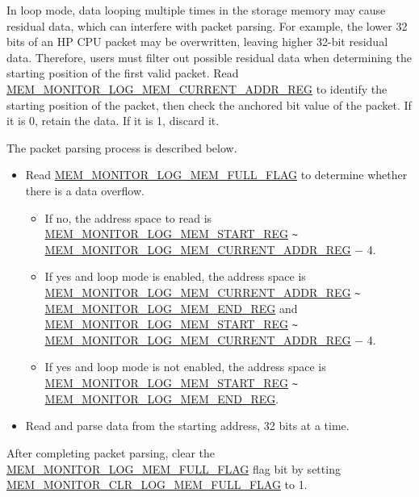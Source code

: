 \documentclass[main\_\_EN.tex]{subfiles}
\begin{document}
In loop mode, data looping multiple times in the storage memory may cause residual data, which can interfere with packet parsing. For example, the lower 32 bits of an HP CPU packet may be overwritten, leaving higher 32-bit residual data. Therefore, users must filter out possible residual data when determining the starting position of the first valid packet. Read \hyperref[regdesc:MEMMONITORLOGMEMCURRENTADDRREG]{MEM\_MONITOR\_LOG\_MEM\_CURRENT\_ADDR\_REG} to identify the starting position of the packet, then check the anchored bit value of the packet. If it is 0, retain the data. If it is 1, discard it. 

The packet parsing process is described below.

\begin{itemize}
    \item Read \hyperref[fielddesc:MEMMONITORLOGMEMFULLFLAG]{MEM\_MONITOR\_LOG\_MEM\_FULL\_FLAG} to determine whether there is a data overflow.
    \begin{itemize}
        \item If no, the address space to read is \hyperref[regdesc:MEMMONITORLOGMEMSTARTREG]{MEM\_MONITOR\_LOG\_MEM\_START\_REG} \verb+~+ \hyperref[regdesc:MEMMONITORLOGMEMCURRENTADDRREG]{MEM\_MONITOR\_LOG\_MEM\_CURRENT\_ADDR\_REG} $-$ 4.
        \item If yes and loop mode is enabled, the address space is \hyperref[regdesc:MEMMONITORLOGMEMCURRENTADDRREG]{MEM\_MONITOR\_LOG\_MEM\_CURRENT\_ADDR\_REG} \verb+~+ \hyperref[regdesc:MEMMONITORLOGMEMENDREG]{MEM\_MONITOR\_LOG\_MEM\_END\_REG} and \hyperref[regdesc:MEMMONITORLOGMEMSTARTREG]{MEM\_MONITOR\_LOG\_MEM\_START\_REG} \verb+~+ \hyperref[regdesc:MEMMONITORLOGMEMCURRENTADDRREG]{MEM\_MONITOR\_LOG\_MEM\_CURRENT\_ADDR\_REG} $-$ 4.
        \item If yes and loop mode is not enabled, the address space is \hyperref[regdesc:MEMMONITORLOGMEMSTARTREG]{MEM\_MONITOR\_LOG\_MEM\_START\_REG} \verb+~+ \hyperref[regdesc:MEMMONITORLOGMEMENDREG]{MEM\_MONITOR\_LOG\_MEM\_END\_REG}.
    \end{itemize}
    \item Read and parse data from the starting address, 32 bits at a time.

\end{itemize}

After completing packet parsing, clear the \hyperref[fielddesc:MEMMONITORLOGMEMFULLFLAG]{MEM\_MONITOR\_LOG\_MEM\_FULL\_FLAG} flag bit by setting \hyperref[fielddesc:MEMMONITORCLRLOGMEMFULLFLAG]{MEM\_MONITOR\_CLR\_LOG\_MEM\_FULL\_FLAG} to 1.
\end{document}
